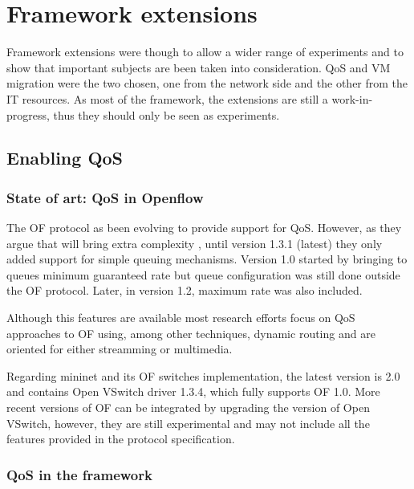 \documentclass[12pt,english,oneside]{book}
\begin{document}
\newpage

\section{Framework extensions \label{Sec:fraext} }
\hspace{0.6cm}

Framework extensions were though to allow a wider range of experiments and to show that important subjects are been taken into consideration. QoS and VM migration were the two chosen, one from the network side and the other from the IT resources.
As most of the framework, the extensions are still a work-in-progress, thus they should only be seen as experiments.

\subsection{Enabling QoS}
\subsubsection{State of art: QoS in Openflow}
\hspace{0.6cm}

The OF protocol as been evolving to provide support for QoS.
However, as they argue that will bring extra complexity \cite{qosof}, until version 1.3.1 (latest) they only added support for simple queuing mechanisms.
Version 1.0 started by bringing to queues minimum guaranteed rate but queue configuration was still done outside the OF protocol. Later, in version 1.2, maximum rate was also included.

Although this features are available most research efforts focus on QoS approaches to OF using, among other techniques, dynamic routing and are oriented for either streamming\cite{ofqos2}\cite{ofqos3} or multimedia\cite{ofqos1}.

Regarding mininet and its OF switches implementation, the latest version is 2.0 and contains Open VSwitch driver 1.3.4, which fully supports OF 1.0.
More recent versions of OF can be integrated by upgrading the version of Open VSwitch, however, they are still experimental and may not include all the features provided in the protocol specification.

\subsubsection{QoS in the framework}
\hspace{0.6cm}
\end{document}
